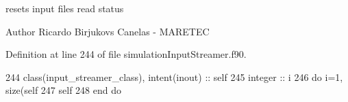 resets input files read status 

\begin{DoxyAuthor}{Author}
Ricardo Birjukovs Canelas -\/ M\+A\+R\+E\+T\+EC 
\end{DoxyAuthor}


Definition at line 244 of file simulation\+Input\+Streamer.\+f90.


\begin{DoxyCode}
244     \textcolor{keywordtype}{class}(input\_streamer\_class), \textcolor{keywordtype}{intent(inout)} :: self
245     \textcolor{keywordtype}{integer} :: i
246     \textcolor{keywordflow}{do} i=1, \textcolor{keyword}{size}(self%
247         self%
248 \textcolor{keywordflow}{    end do}
\end{DoxyCode}
